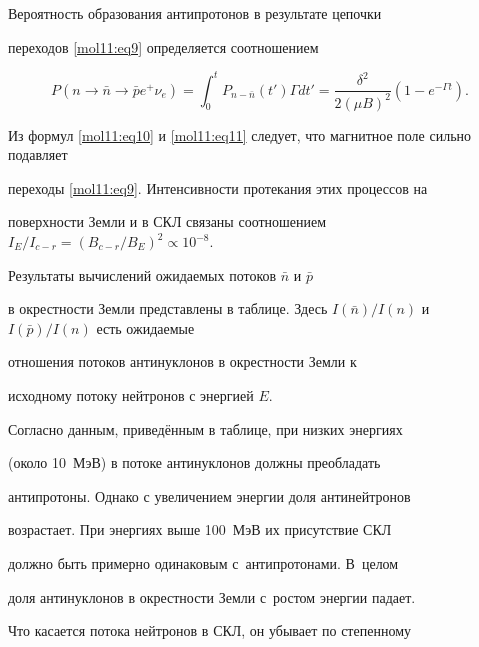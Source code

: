 Вероятность образования антипротонов в результате цепочки

переходов \eqref{mol11:eq9} определяется соотношением

 \begin{equation}

  \label{mol11:eq11}

 P(n \to \bar  n \to \bar  p e^+ \nu_e) =

 \int_0^t  P_{n {-} \bar  n}(t') \Gamma dt' =

  \frac{\delta^2}{2 (\mu B)^2} (1 - e^{- \Gamma t}).

 \end{equation}



 Из формул \eqref{mol11:eq10} и \eqref{mol11:eq11} следует, что магнитное поле сильно подавляет

 переходы \eqref{mol11:eq9}. Интенсивности протекания этих процессов на

поверхности Земли и в СКЛ связаны соотношением $I_E/I_{c{-}r} =

 (B_{c{-}r}/B_E)^2 \propto 10^{-8}$.



Результаты вычислений ожидаемых потоков $\bar  n$ и $\bar  p$

в окрестности Земли представлены в таблице. Здесь $ I(\bar  n) / I(n)$ и $ I(\bar  p) / I(n)$ есть ожидаемые

 отношения потоков антинуклонов в окрестности Земли к

  исходному потоку нейтронов с энергией $E$.











 Согласно данным, приведённым в таблице, при низких энергиях

 (около 10~МэВ) в потоке антинуклонов должны преобладать

 антипротоны. Однако с увеличением энергии доля антинейтронов

 возрастает. При энергиях выше 100~МэВ их присутствие СКЛ

 должно быть примерно одинаковым с~антипротонами. В~целом

 доля антинуклонов в окрестности Земли с~ростом энергии падает.



 Что касается потока нейтронов в СКЛ, он убывает по степенному

